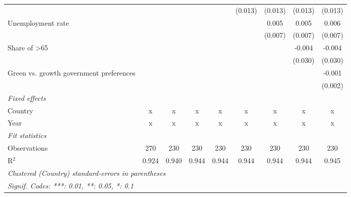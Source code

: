 \begin{table}[htbp]
\begin{tabular}{lcccccccc}
                                                            &         &         &                &                & (0.013)        & (0.013)        & (0.013)        & (0.013)\\   
      Unemployment rate                                     &         &         &                &                &                & 0.005          & 0.005          & 0.006\\   
                                                            &         &         &                &                &                & (0.007)        & (0.007)        & (0.007)\\   
      Share of >65                                          &         &         &                &                &                &                & -0.004         & -0.004\\   
                                                            &         &         &                &                &                &                & (0.030)        & (0.030)\\   
      Green vs. growth government preferences               &         &         &                &                &                &                &                & -0.001\\   
                                                            &         &         &                &                &                &                &                & (0.002)\\   
      \emph{Fixed effects}\\
      Country                                               & x       & x       & x              & x              & x              & x              & x              & x\\  
      Year                                                  & x       & x       & x              & x              & x              & x              & x              & x\\  
      \midrule \emph{Fit statistics}\\
      Observations                                          & 270     & 230     & 230            & 230            & 230            & 230            & 230            & 230\\  
      R$^2$                                                 & 0.924   & 0.940   & 0.944          & 0.944          & 0.944          & 0.944          & 0.944          & 0.945\\  
      \midrule
      \multicolumn{9}{l}{\emph{Clustered (Country) standard-errors in parentheses}}\\
      \multicolumn{9}{l}{\emph{Signif. Codes: ***: 0.01, **: 0.05, *: 0.1}}\\
   \end{tabular}
\end{table}


